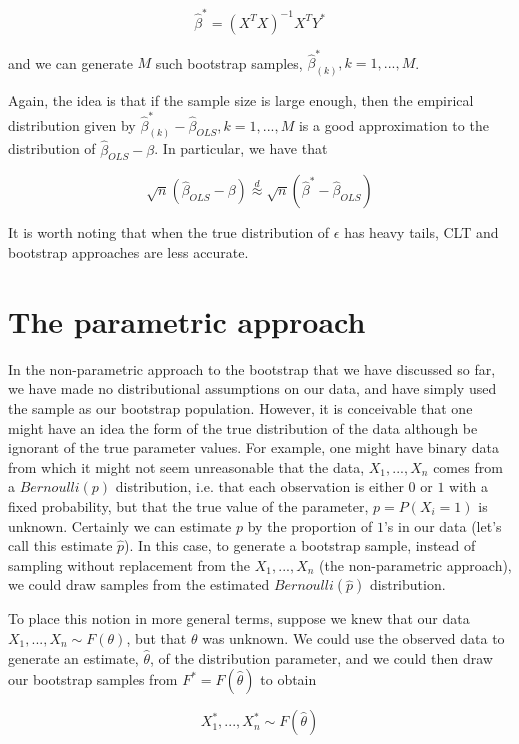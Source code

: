 $$\hat{\beta}^* = (X^TX)^{-1}X^T Y^*$$

and we can generate $M$ such bootstrap samples, $\hat{\beta}^*_{(k)}, k = 1, ..., M$.


Again, the idea is that if the sample size is large enough, then the empirical distribution given by $\hat{\beta}^*_{(k)} - \hat{\beta}_{OLS}, k = 1, ..., M$ is a good approximation to the distribution of $\hat{\beta}_{OLS} - \beta$. In particular, we have that


$$\sqrt{n} \left( \hat{\beta}_{OLS} - \beta\right) \overset{d}{\approx} \sqrt{n}\left(\hat{\beta}^* - \hat{\beta}_{OLS}\right)$$

It is worth noting that when the true distribution of $\epsilon$ has heavy tails, CLT and bootstrap approaches are less accurate.



\section{The parametric approach}

In the non-parametric approach to the bootstrap that we have discussed so far, we have made no distributional assumptions on our data, and have simply used the sample as our bootstrap population. However, it is conceivable that one might have an idea the form of the true distribution of the data although be ignorant of the true parameter values. For example, one might have binary data from which it might not seem unreasonable that the data, $X_1, ..., X_n$ comes from a $Bernoulli(p)$ distribution, i.e. that each observation is either $0$ or $1$ with a fixed probability, but that the true value of the parameter, $p = P(X_i = 1)$ is unknown. Certainly we can estimate $p$ by the proportion of $1$'s in our data (let's call this estimate $\hat{p}$). In this case, to generate a bootstrap sample, instead of sampling without replacement from the $X_1, ..., X_n$ (the non-parametric approach), we could draw samples from the estimated $Bernoulli(\hat{p})$ distribution. 

To place this notion in more general terms, suppose we knew that our data $X_1, ..., X_n \sim F(\theta)$, but that $\theta$ was unknown. We could use the observed data to generate an estimate, $\hat{\theta}$, of the distribution parameter, and we could then draw our bootstrap samples from $F^* = F(\hat{\theta})$ to obtain

$$X_1^* , ..., X_n^* \sim F\left(\hat{\theta}\right)$$


